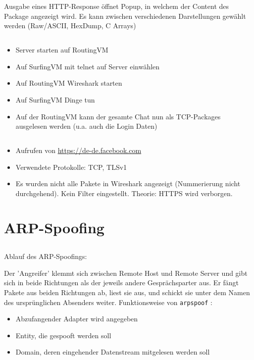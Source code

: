 \documentclass[twoside]{article}
\newcommand{\ttt}[1]{%
	\texttt{#1}%
}
\begin{document}
Ausgabe eines HTTP-Response öffnet Popup, in welchem der Content des Package angezeigt wird.
Es kann zwischen verschiedenen Darstellungen gewählt werden (Raw/ASCII, HexDump, C Arrays)
\subsection{}
\begin{itemize}
	\item Server starten auf RoutingVM
	\item Auf SurfingVM mit telnet auf Server einwählen
	\item Auf RoutingVM Wireshark starten
	\item Auf SurfingVM Dinge tun
	\item Auf der RoutingVM kann der gesamte Chat nun als TCP-Packages ausgelesen werden (u.a. auch die Login Daten)
\end{itemize}
\subsection{}
\begin{itemize}
	\item Aufrufen von \url{https://de-de.facebook.com}
	\item Verwendete Protokolle: TCP, TLSv1
	\item Es wurden nicht alle Pakete in Wireshark angezeigt (Nummerierung nicht durchgehend).
	Kein Filter eingestellt.
	Theorie: HTTPS wird verborgen.
\end{itemize}



\section{ARP-Spoofing}
\subsection{}
Ablauf des ARP-Spoofings:

Der 'Angreifer' klemmt sich zwischen Remote Host und Remote Server und gibt sich in beide Richtungen als der jeweils andere Gesprächsparter aus.
Er fängt Pakete aus beiden Richtungen ab, liest sie aus, und schickt sie unter dem Namen des ursprünglichen Absenders weiter.
Funktionsweise von \ttt{arpspoof}:
\begin{itemize}
	\item Abzufangender Adapter wird angegeben
	\item Entity, die gespooft werden soll
	\item Domain, deren eingehender Datenstream mitgelesen werden soll
\end{itemize}
\end{document}
